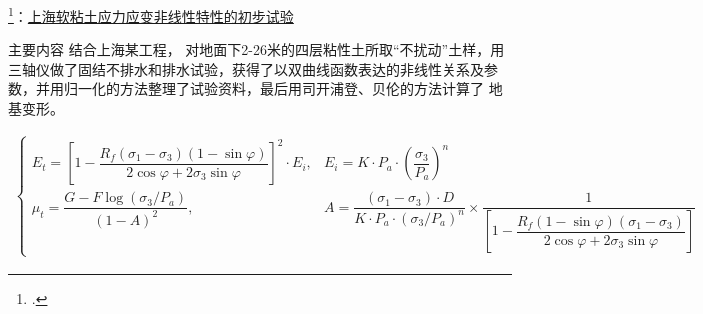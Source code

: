 \begin{frame}{\footcite{Deng1980}：\href{run:./papers/Deng1980-上海软粘土应力应变非线性特性的初步试验.pdf}{上海软粘土应力应变非线性特性的初步试验}}
    \begin{block}{主要内容}
        结合上海某工程， 对地面下2-26米的四层粘性土所取``不扰动''土样，用三轴仪做了固结不排水和排水试验，获得了以双曲线函数表达的非线性关系及参数，并用归一化的方法整理了试验资料，最后用司开浦登、贝伦的方法计算了 地基变形。
        \begin{small}
            \begin{align}
                \begin{cases}
                    E_{t}=\left[1-\dfrac{R_{f}\left(\sigma_{1}-\sigma_{3}\right)(1-\sin \varphi)}{2 \cos \varphi+2 \sigma_{3} \sin \varphi}\right]^{2} \cdot E_{i}, &E_{i}=K \cdot P_{a} \cdot\left(\dfrac{\sigma_{3}}{P_{a}}\right)^{n} \\[5mm]
                    \mu_{t}=\dfrac{G-F \log \left(\sigma_{3} / P_{a}\right)}{(1-A)^{2}}, &A=\dfrac{\left(\sigma_{1}-\sigma_{3}\right) \cdot D}{K \cdot P_{a} \cdot\left(\sigma_{3} / P_{a}\right)^{n}} \times \dfrac{1}{\left[1-\dfrac{R_{f}(1-\sin \varphi)\left(\sigma_{1}-\sigma_{3}\right)}{2 \cos \varphi+2 \sigma_{3} \sin \varphi}\right]}
                \end{cases}
            \end{align}
        \end{small}
    \end{block}
\end{frame}

